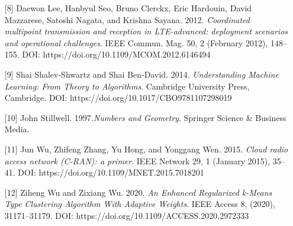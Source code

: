 \documentclass{article}
\begin{document}
{\begin{enumerate}
\item[{[8]}] Daewon Lee, Hanbyul Seo, Bruno Clerckx, Eric Hardouin, David Mazzarese, Satoshi Nagata, and Krishna Sayana. 2012. \textit{Coordinated multipoint transmission and reception in LTE-advanced: deployment scenarios and operational challenges}. IEEE Commun. Mag. 50, 2 (February 2012), 148–155. DOI: https://doi.org/10.1109/MCOM.2012.6146494
\item[{[9]}] Shai Shalev-Shwartz and Shai Ben-David. 2014. \textit{Understanding Machine Learning: From Theory to Algorithms}. Cambridge University Press, Cambridge. DOI: https://doi.org/10.1017/CBO9781107298019
\item[{[10]}] John Stillwell. 1997.\textit{Numbers and Geometry}. Springer Science & Business Media.
\item[{[11]}] Jun Wu, Zhifeng Zhang, Yu Hong, and Yonggang Wen. 2015. \textit{Cloud radio access network (C-RAN): a primer}. IEEE Network 29, 1 (January 2015), 35–41. DOI: https://doi.org/10.1109/MNET.2015.7018201
\item[{[12]}] Ziheng Wu and Zixiang Wu. 2020. \textit{An Enhanced Regularized k-Means Type Clustering Algorithm With Adaptive Weights}. IEEE Access 8, (2020), 31171–31179. DOI: https://doi.org/10.1109/ACCESS.2020.2972333
\end{enumerate}
}
\end{document}
